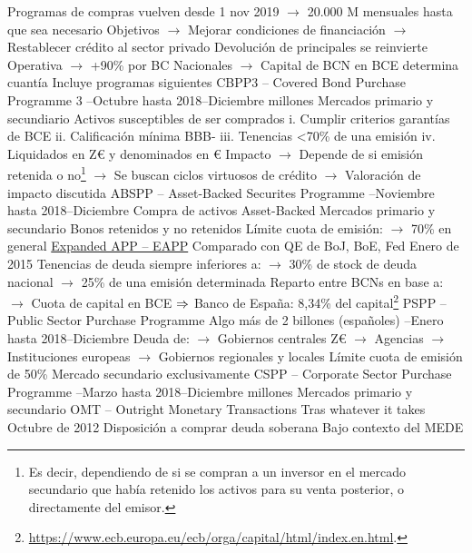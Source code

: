 \documentclass{nuevotema}
\begin{document}
\begin{esquemal}
				\4[] Programas de compras vuelven desde 1 nov 2019
				\4[] $\to$ 20.000 M mensuales hasta que sea necesario
				\4[] Objetivos
				\4[] $\to$ Mejorar condiciones de financiación
				\4[] $\to$ Restablecer crédito al sector privado
				\4[] Devolución de principales se reinvierte
				\4[] Operativa
				\4[] $\to$ +90\% por BC Nacionales
				\4[] $\to$ Capital de BCN en BCE determina cuantía
				\4[] Incluye programas siguientes
				\4 CBPP3 -- Covered Bond Purchase Programme 3
				--Octubre hasta 2018--Diciembre
				 millones
				\4[] Mercados primario y secundiario
				\4[] Activos susceptibles de ser comprados
				\4[] i. Cumplir criterios garantías de BCE
				\4[] ii. Calificación mínima BBB-
				\4[] iii. Tenencias <70\% de una emisión
				\4[] iv. Liquidados en Z€ y denominados en €
				\4[] Impacto
				\4[] $\to$ Depende de si emisión retenida o no\footnote{Es decir, dependiendo de si se compran a un inversor en el mercado secundario que había retenido los activos para su venta posterior, o directamente del emisor.}
				\4[] $\to$ Se buscan ciclos virtuosos de crédito
				\4[] $\to$ Valoración de impacto discutida
				\4 ABSPP -- Asset-Backed Securites Programme
				--Noviembre hasta 2018--Diciembre
				\4[] Compra de activos Asset-Backed
				\4[] Mercados primario y secundario
				\4[] Bonos retenidos y no retenidos
				\4[] Límite cuota de emisión:
				\4[] $\to$ 70\% en general
				\4 \underline{Expanded APP -- EAPP}
				\4[] Comparado con QE de BoJ, BoE, Fed
				\4[] Enero de 2015
				\4[] Tenencias de deuda siempre inferiores a:
				\4[] $\to$ 30\% de stock de deuda nacional
				\4[] $\to$ 25\% de una emisión determinada
				\4[] Reparto entre BCNs en base a:
				\4[] $\to$ Cuota de capital en BCE
				\4[] $\Rightarrow$ Banco de España: 8,34\% del capital\footnote{\url{https://www.ecb.europa.eu/ecb/orga/capital/html/index.en.html}.}
				\4 PSPP -- Public Sector Purchase Programme
				\4[] Algo más de 2 billones (españoles)
				--Enero hasta 2018--Diciembre
				\4[] Deuda de:
				\4[] $\to$ Gobiernos centrales Z€
				\4[] $\to$ Agencias
				\4[] $\to$ Instituciones europeas
				\4[] $\to$ Gobiernos regionales y locales
				\4[] Límite cuota de emisión de 50\%
				\4[] Mercado secundario exclusivamente
				\4 CSPP -- Corporate Sector Purchase Programme
				--Marzo hasta 2018--Diciembre
				 millones
				\4[] Mercados primario y secundario
				\4 OMT -- Outright Monetary Transactions
				\4[] Tras whatever it takes
				\4[] Octubre de 2012
				\4[] Disposición a comprar deuda soberana
				\4[] Bajo contexto del MEDE

\end{esquemal}
\end{document}
